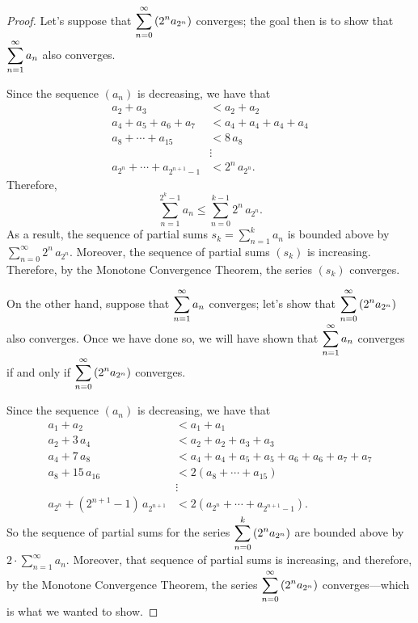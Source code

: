 \begin{proof}
  Let's suppose that $\displaystyle\sum_{n=0}^\infty \left( 2^n a_{2^n} \right)$
  converges; the goal then is to show that $\displaystyle\sum_{n=1}^\infty a_n$
  also converges.

  Since the sequence $(a_n)$ is decreasing, we have that
  \begin{align*}
  a_2 + a_3 &< a_2 + a_2 \\
  a_4 + a_5 + a_6 + a_7 &< a_4 + a_4 + a_4 + a_4 \\
  a_8 + \cdots + a_{15} &< 8 \, a_8 \\
  &\vdots \\
  a_{2^n} + \cdots + a_{2^{n+1} - 1} &< 2^n \, a_{2^n}.
  \end{align*}
  Therefore,
  $$
  \sum_{n=1}^{2^k - 1} a_n \leq \sum_{n=0}^{k-1} 2^n \, a_{2^n}.
  $$
  As a result, the sequence of partial sums $s_k = \sum_{n=1}^k a_n$ is bounded above by $\sum_{n=0}^\infty 2^n \, a_{2^n}$.  Moreover, the sequence of partial sums $(s_k)$ is increasing.  Therefore, by the Monotone Convergence Theorem, the series $(s_k)$ converges.

  On the other hand, suppose that $\displaystyle\sum_{n=1}^\infty a_n$ converges; let's show that $\displaystyle\sum_{n=0}^\infty \left( 2^n a_{2^n} \right)$
  also converges.  Once we have done so, we will have shown that  $\displaystyle\sum_{n=1}^\infty a_n$ converges if and only if $\displaystyle\sum_{n=0}^\infty \left( 2^n a_{2^n} \right)$ converges.

  Since the sequence $(a_n)$ is decreasing, we have that
  \begin{align*}
  a_1 + a_2 &< a_1 + a_1 \\
  a_2 + 3\,a_4 &< a_2 + a_2 + a_3 + a_3 \\
  a_4 + 7 \, a_8 &< a_4 + a_4 + a_5 + a_5 + a_6 + a_6 + a_7 + a_7 \\
  a_8 + 15 \, a_{16} &< 2(a_8 + \cdots + a_{15}) \\
  &\vdots \\
  a_{2^n} + (2^{n+1} - 1) \, a_{2^{n+1}} &< 2(a_{2^{n}} + \cdots + a_{2^{n+1} - 1}).
  \end{align*}
  So the sequence of partial sums for the series $\displaystyle\sum_{n=0}^k \left( 2^n a_{2^n} \right)$ are bounded above by $2 \cdot \sum_{n=1}^\infty a_n$.  Moreover, that sequence of partial sums is increasing, and therefore, by the Monotone Convergence Theorem, the series $\displaystyle\sum_{n=0}^\infty \left( 2^n a_{2^n} \right)$ converges---which is what we wanted to show.  
\end{proof}


